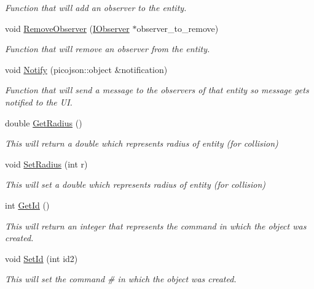 \begin{DoxyCompactItemize}
\begin{DoxyCompactList}\small\item\em Function that will add an observer to the entity. \end{DoxyCompactList}\item 
void \hyperlink{classEntity_a8e6bb1a529eaa32782d83824861ff29f}{Remove\+Observer} (\hyperlink{classIObserver}{I\+Observer} $\ast$observer\+\_\+to\+\_\+remove)
\begin{DoxyCompactList}\small\item\em Function that will remove an observer from the entity. \end{DoxyCompactList}\item 
void \hyperlink{classEntity_a9e180b76d5dfa6652edcffaf0aea5ec0}{Notify} (picojson\+::object \&notification)
\begin{DoxyCompactList}\small\item\em Function that will send a message to the observers of that entity so message gets notified to the UI. \end{DoxyCompactList}\item 
double \hyperlink{classEntity_a01b41a1294ffea6e11a897c633a14ef4}{Get\+Radius} ()
\begin{DoxyCompactList}\small\item\em This will return a double which represents radius of entity (for collision) \end{DoxyCompactList}\item 
void \hyperlink{classEntity_acf8bd6d266b147e86248c1ce5d925665}{Set\+Radius} (int r)
\begin{DoxyCompactList}\small\item\em This will set a double which represents radius of entity (for collision) \end{DoxyCompactList}\item 
int \hyperlink{classEntity_a0040a9ca2da893a4eccec20f542220a9}{Get\+Id} ()
\begin{DoxyCompactList}\small\item\em This will return an integer that represents the command in which the object was created. \end{DoxyCompactList}\item 
void \hyperlink{classEntity_ac806fc870b7d2419fbd207cf6ca4dd2e}{Set\+Id} (int id2)
\begin{DoxyCompactList}\small\item\em This will set the command \# in which the object was created. \end{DoxyCompactList}\item 

\end{DoxyCompactItemize}
